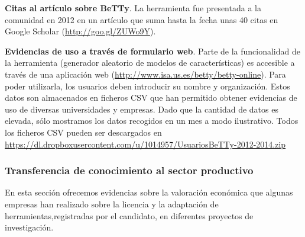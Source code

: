 




\textbf{Citas al artículo sobre BeTTy}. La herramienta fue presentada a la comunidad en 2012 en un artículo que suma hasta la fecha unas 40 citas en Google Scholar (\url{http://goo.gl/ZUWo9Y}).  



\textbf{Evidencias de uso a través de formulario web}. Parte de la funcionalidad de la herramienta (generador aleatorio de modelos de características) es accesible a través de una aplicación web (\url{http://www.isa.us.es/betty/betty-online}). Para poder utilizarla, los usuarios deben introducir su nombre y organización. Estos datos son almacenados en ficheros CSV que han permitido obtener evidencias de uso de diversas universidades y empresas. Dado que la cantidad de datos es elevada, sólo mostramos los datos recogidos en un mes a modo ilustrativo. Todos los ficheros CSV pueden ser descargados en \url{https://dl.dropboxusercontent.com/u/1014957/UsuariosBeTTy-2012-2014.zip} 



\newpage

%
\subsubsection{Transferencia de conocimiento al sector productivo}
\label{Tfcia-conocimiento}
En esta sección ofrecemos evidencias sobre la valoración económica que algunas empresas han realizado sobre la licencia y la adaptación de herramientas,registradas por el candidato, en diferentes proyectos de investigación.

